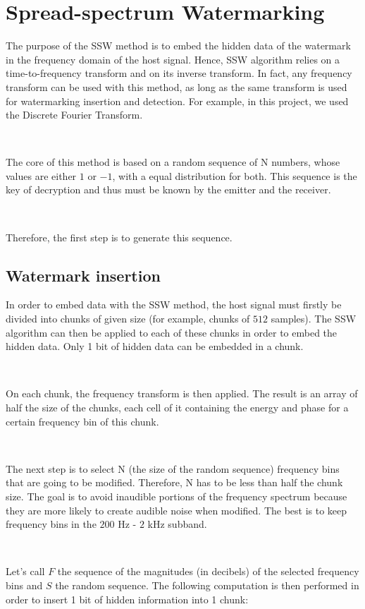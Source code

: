\section{Spread-spectrum Watermarking}

The purpose of the \ac{SSW} method is to embed the hidden data of the watermark in the frequency domain of the host signal\cite{cox1997secure}. Hence, \ac{SSW} algorithm relies on a time-to-frequency transform and on its inverse transform. In fact, any frequency transform can be used with this method, as long as the same transform is used for watermarking insertion and detection. For example, in this project, we used the Discrete Fourier Transform.

~

The core of this method is based on a random sequence of N numbers, whose values are either $1$ or $-1$, with a equal distribution for both. This sequence is the key of decryption and thus must be known by the emitter and the receiver.

~

Therefore, the first step is to generate this sequence.

\subsection{Watermark insertion}

In order to embed data with the \ac{SSW} method, the host signal must firstly be divided into chunks of given size (for example, chunks of $512$ samples). The \ac{SSW} algorithm can then be applied to each of these chunks in order to embed the hidden data. Only 1 bit of hidden data can be embedded in a chunk.

~

On each chunk, the frequency transform is then applied. The result is an array of half the size of the chunks, each cell of it containing the energy and phase for a certain frequency bin of this chunk.

~

The next step is to select N (the size of the random sequence) frequency bins that are going to be modified. Therefore, N has to be less than half the chunk size. The goal is to avoid inaudible portions of the frequency spectrum because they are more likely to create audible noise when modified. The best is to keep frequency bins in the $200$ Hz - $2$ kHz subband.

~

Let's call $F$ the sequence of the magnitudes (in decibels) of the selected frequency bins and $S$ the random sequence. The following computation is then performed in order to insert 1 bit of hidden information into 1 chunk:

